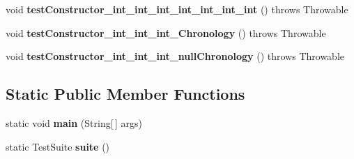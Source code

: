 \begin{DoxyCompactItemize}
\item 
\hypertarget{classorg_1_1joda_1_1time_1_1_test_local_date_time___constructors_a84da33f2e8d2951837e899c987e8a6f5}{void {\bfseries test\-Constructor\-\_\-int\-\_\-int\-\_\-int\-\_\-int\-\_\-int\-\_\-int\-\_\-int} ()  throws Throwable }\label{classorg_1_1joda_1_1time_1_1_test_local_date_time___constructors_a84da33f2e8d2951837e899c987e8a6f5}

\item 
\hypertarget{classorg_1_1joda_1_1time_1_1_test_local_date_time___constructors_a8c77ce819e031bed14e459f0ffc260d2}{void {\bfseries test\-Constructor\-\_\-int\-\_\-int\-\_\-int\-\_\-\-Chronology} ()  throws Throwable }\label{classorg_1_1joda_1_1time_1_1_test_local_date_time___constructors_a8c77ce819e031bed14e459f0ffc260d2}

\item 
\hypertarget{classorg_1_1joda_1_1time_1_1_test_local_date_time___constructors_ac0f532862d3c37a2aaf02fcba5615763}{void {\bfseries test\-Constructor\-\_\-int\-\_\-int\-\_\-int\-\_\-null\-Chronology} ()  throws Throwable }\label{classorg_1_1joda_1_1time_1_1_test_local_date_time___constructors_ac0f532862d3c37a2aaf02fcba5615763}

\end{DoxyCompactItemize}
\subsection*{Static Public Member Functions}
\begin{DoxyCompactItemize}
\item 
\hypertarget{classorg_1_1joda_1_1time_1_1_test_local_date_time___constructors_a151430406855d1cfe5e325e0ec9fe6b6}{static void {\bfseries main} (String\mbox{[}$\,$\mbox{]} args)}\label{classorg_1_1joda_1_1time_1_1_test_local_date_time___constructors_a151430406855d1cfe5e325e0ec9fe6b6}

\item 
\hypertarget{classorg_1_1joda_1_1time_1_1_test_local_date_time___constructors_ad880efa064d95db88c9c5f0f7f0dd1f2}{static Test\-Suite {\bfseries suite} ()}\label{classorg_1_1joda_1_1time_1_1_test_local_date_time___constructors_ad880efa064d95db88c9c5f0f7f0dd1f2}

\end{DoxyCompactItemize}
